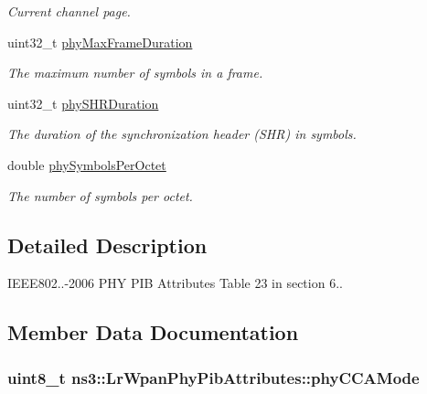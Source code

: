 \begin{DoxyCompactItemize}
\begin{DoxyCompactList}\small\item\em Current channel page. \end{DoxyCompactList}\item 
uint32\+\_\+t \hyperlink{structns3_1_1LrWpanPhyPibAttributes_ad1b1881fc2d7d2932289b0aa466cd38e}{phy\+Max\+Frame\+Duration}
\begin{DoxyCompactList}\small\item\em The maximum number of symbols in a frame. \end{DoxyCompactList}\item 
uint32\+\_\+t \hyperlink{structns3_1_1LrWpanPhyPibAttributes_aab1a755b2d7e44e183c2ec7c53f4226e}{phy\+S\+H\+R\+Duration}
\begin{DoxyCompactList}\small\item\em The duration of the synchronization header (S\+HR) in symbols. \end{DoxyCompactList}\item 
double \hyperlink{structns3_1_1LrWpanPhyPibAttributes_a7fd39e2ca8da87b2bdc6260983c15a5d}{phy\+Symbols\+Per\+Octet}
\begin{DoxyCompactList}\small\item\em The number of symbols per octet. \end{DoxyCompactList}\end{DoxyCompactItemize}


\subsection{Detailed Description}
I\+E\+E\+E802..-\/2006 P\+HY P\+IB Attributes Table 23 in section 6.. 

\subsection{Member Data Documentation}
\subsubsection[{\texorpdfstring{phy\+C\+C\+A\+Mode}{phyCCAMode}}]{\setlength{\rightskip}{0pt plus 5cm}uint8\+\_\+t ns3\+::\+Lr\+Wpan\+Phy\+Pib\+Attributes\+::phy\+C\+C\+A\+Mode}\hypertarget{structns3_1_1LrWpanPhyPibAttributes_a41d736be38b2dd87bb9fa2b2090723e8}{}\label{structns3_1_1LrWpanPhyPibAttributes_a41d736be38b2dd87bb9fa2b2090723e8}


